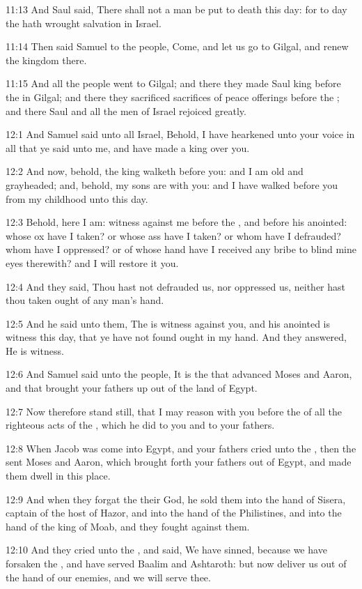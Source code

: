 11:13 And Saul said, There shall not a man be put to death this day: for to day the \LORD hath wrought salvation in Israel.

11:14 Then said Samuel to the people, Come, and let us go to Gilgal, and renew the kingdom there.

11:15 And all the people went to Gilgal; and there they made Saul king before the \LORD in Gilgal; and there they sacrificed sacrifices of peace offerings before the \LORD; and there Saul and all the men of Israel rejoiced greatly.

12:1 And Samuel said unto all Israel, Behold, I have hearkened unto your voice in all that ye said unto me, and have made a king over you.

12:2 And now, behold, the king walketh before you: and I am old and grayheaded; and, behold, my sons are with you: and I have walked before you from my childhood unto this day.

12:3 Behold, here I am: witness against me before the \LORD, and before his anointed: whose ox have I taken? or whose ass have I taken? or whom have I defrauded? whom have I oppressed? or of whose hand have I received any bribe to blind mine eyes therewith? and I will restore it you.

12:4 And they said, Thou hast not defrauded us, nor oppressed us, neither hast thou taken ought of any man's hand.

12:5 And he said unto them, The \LORD is witness against you, and his anointed is witness this day, that ye have not found ought in my hand.  And they answered, He is witness.

12:6 And Samuel said unto the people, It is the \LORD that advanced Moses and Aaron, and that brought your fathers up out of the land of Egypt.

12:7 Now therefore stand still, that I may reason with you before the \LORD of all the righteous acts of the \LORD, which he did to you and to your fathers.

12:8 When Jacob was come into Egypt, and your fathers cried unto the \LORD, then the \LORD sent Moses and Aaron, which brought forth your fathers out of Egypt, and made them dwell in this place.

12:9 And when they forgat the \LORD their God, he sold them into the hand of Sisera, captain of the host of Hazor, and into the hand of the Philistines, and into the hand of the king of Moab, and they fought against them.

12:10 And they cried unto the \LORD, and said, We have sinned, because we have forsaken the \LORD, and have served Baalim and Ashtaroth: but now deliver us out of the hand of our enemies, and we will serve thee.

